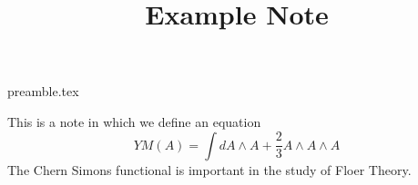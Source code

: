 
\RequirePackage{import}
{preamble.tex}

\title{Example Note}


    \maketitle \label{note}
    This is a note in which we define an equation
    \begin{equation} \label{equation:chern simons functional}
        YM(A) = \int dA \wedge A + \frac23 A \wedge A \wedge A
    \end{equation}
    The Chern Simons functional is important in the study of Floer Theory.

